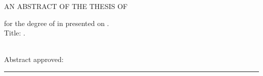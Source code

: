 \vspace{-3.5mm}

\begin{center} 
{AN ABSTRACT OF THE THESIS OF} 
\end{center}

%

\noindent
{\raggedright
\underline{\phantom{,}\myname\phantom{,}}
for the degree of 
\underline{\phantom{,}\mydegree\phantom{,}} in
\underline{\phantom{,}\mymajor\phantom{,}}
presented on 
\underline{\phantom{,}\myday\phantom{,}}. \\
Title: \underline{\phantom{,}\mytitle\phantom{,}}. \\ }
\hfil\strut\\
Abstract approved:\\
\rule{\textwidth}{0.2mm} \\
\vspace{-0.8cm}
\begin{center}
\myadvisor\break
\end{center}


\bigskip


